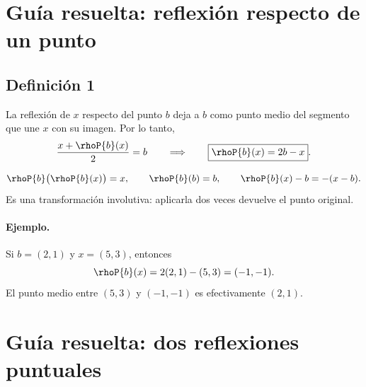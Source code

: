 \section{Guía resuelta: reflexión respecto de un punto}\label{cap:09}

\subsection{Definición 1}

La reflexión de \(x\) respecto del punto \(b\) deja a \(b\) como punto medio del segmento
que une \(x\) con su imagen. Por lo tanto,
\[
  \frac{x+\rhoP{b}(x)}{2}=b
  \qquad\Longrightarrow\qquad
  \boxed{\rhoP{b}(x)=2b-x}.
\]

\begin{center}
\end{center}

\begin{resultado}
\[
  \rhoP{b}\bigl(\rhoP{b}(x)\bigr)=x,
  \qquad
  \rhoP{b}(b)=b,
  \qquad
  \rhoP{b}(x)-b=-(x-b).
\]
Es una transformación involutiva: aplicarla dos veces devuelve el punto original.
\end{resultado}

\paragraph{Ejemplo.}
Si \(b=(2,1)\) y \(x=(5,3)\), entonces
\[
  \rhoP{b}(x)=2(2,1)-(5,3)=(-1,-1).
\]
El punto medio entre \((5,3)\) y \((-1,-1)\) es efectivamente \((2,1)\).

\section{Guía resuelta: dos reflexiones puntuales}

